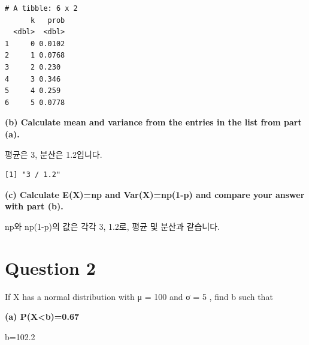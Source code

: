 \documentclass[
  a4paper,
  DIV=11,
  numbers=noendperiod]{scrreprt}
\newenvironment{Shaded}{\begin{snugshade}}{\end{snugshade}}
\newcommand{\AttributeTok}[1]{\textcolor[rgb]{0.40,0.45,0.13}{#1}}
\newcommand{\DecValTok}[1]{\textcolor[rgb]{0.68,0.00,0.00}{#1}}
\newcommand{\FunctionTok}[1]{\textcolor[rgb]{0.28,0.35,0.67}{#1}}
\newcommand{\NormalTok}[1]{\textcolor[rgb]{0.00,0.23,0.31}{#1}}
\newcommand{\OtherTok}[1]{\textcolor[rgb]{0.00,0.23,0.31}{#1}}
\newcommand{\SpecialCharTok}[1]{\textcolor[rgb]{0.37,0.37,0.37}{#1}}
\newcommand{\StringTok}[1]{\textcolor[rgb]{0.13,0.47,0.30}{#1}}
\begin{document}
\begin{verbatim}
# A tibble: 6 x 2
      k   prob
  <dbl>  <dbl>
1     0 0.0102
2     1 0.0768
3     2 0.230 
4     3 0.346 
5     4 0.259 
6     5 0.0778
\end{verbatim}

\textbf{(b) Calculate mean and variance from the entries in the list
from part (a).}

평균은 3, 분산은 1.2입니다.

\begin{Shaded}
\end{Shaded}

\begin{verbatim}
[1] "3 / 1.2"
\end{verbatim}

\textbf{(c) Calculate E(X)=np and Var(X)=np(1-p) and compare your answer
with part (b).}

np와 np(1-p)의 값은 각각 3, 1.2로, 평균 및 분산과 같습니다.

\section*{Question 2}\label{question-2-1}


If X has a normal distribution with μ = 100 and σ = 5 , find b such that

\textbf{(a) P(X\textless b)=0.67}

b=102.2
\end{document}
